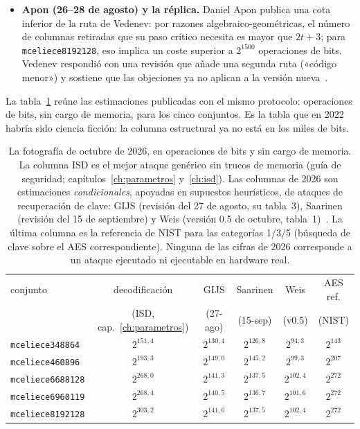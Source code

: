 \begin{itemize}[leftmargin=1.5em,itemsep=3pt]
        100 y 1400 ejecuciones; otra, de una sola ejecución, que
        construye sobre el key recovery de GIJS. «Nada de esto está
        cerca de lo práctico ---escribe---, y una ejecución a tamaño
        completo no puede probarse»~\cite{weis2026}.
  \item \textbf{Apon (26--28 de agosto) y la réplica.} Daniel Apon
        publica una cota inferior de la ruta de Vedenev: por razones
        algebraico-geométricas, el número de columnas retiradas que
        su paso crítico necesita es mayor que $2t+3$; para
        \texttt{mceliece8192128}, eso implica un coste superior a
        $2^{1500}$ operaciones de bits. Vedenev respondió con una
        revisión que añade una segunda ruta
        («código menor») y sostiene que las objeciones ya no aplican
        a la versión nueva~\cite{apon2026,vedenev2026}.
\end{itemize}

La tabla~\ref{tab:2026-costes} reúne las estimaciones publicadas con
el mismo protocolo: operaciones de bits, sin cargo de memoria, para
los cinco conjuntos. Es la tabla que en 2022 habría sido ciencia
ficción: la columna estructural ya no está en los miles de bits.

\begin{table}[htbp]
\centering
\footnotesize
\setlength{\tabcolsep}{6pt}
\begin{tabular}{lccccc}
\toprule
conjunto & decodificación & GIJS & Saarinen & Weis &
AES ref.\\
 & (ISD, cap.~\ref{ch:parametros}) & (27-ago) & (15-sep) & (v0.5) & (NIST)\\
\midrule
\texttt{mceliece348864} & $2^{151{,}4}$ & $2^{130{,}4}$ & $2^{126{,}8}$ & $2^{94{,}3}$ & $2^{143}$\\
\texttt{mceliece460896} & $2^{193{,}3}$ & $2^{149{,}0}$ & $2^{145{,}2}$ & $2^{99{,}3}$ & $2^{207}$\\
\texttt{mceliece6688128} & $2^{268{,}0}$ & $2^{141{,}3}$ & $2^{137{,}5}$ & $2^{102{,}4}$ & $2^{272}$\\
\texttt{mceliece6960119} & $2^{268{,}4}$ & $2^{140{,}5}$ & $2^{136{,}7}$ & $2^{101{,}6}$ & $2^{272}$\\
\texttt{mceliece8192128} & $2^{303{,}2}$ & $2^{141{,}6}$ & $2^{137{,}5}$ & $2^{102{,}4}$ & $2^{272}$\\
\bottomrule
\end{tabular}
\caption{La fotografía de octubre de 2026, en operaciones de bits y
sin cargo de memoria. La columna ISD es el mejor ataque genérico sin
trucos de memoria (guía de seguridad; capítulos~\ref{ch:parametros}
y~\ref{ch:isd}). Las columnas de 2026 son estimaciones
\emph{condicionales}, apoyadas en supuestos heurísticos, de ataques
de recuperación de clave: GIJS (revisión del 27 de agosto, su
tabla~3), Saarinen (revisión del 15 de septiembre) y Weis (versión
0.5 de octubre, tabla~1)~\cite{ghoshal2026,saarinen2026a,weis2026}.
La última columna es la referencia de NIST para las categorías
1/3/5 (búsqueda de clave sobre el AES correspondiente). Ninguna de
las cifras de 2026 corresponde a un ataque ejecutado ni ejecutable
en hardware real.}
\label{tab:2026-costes}
\end{table}

